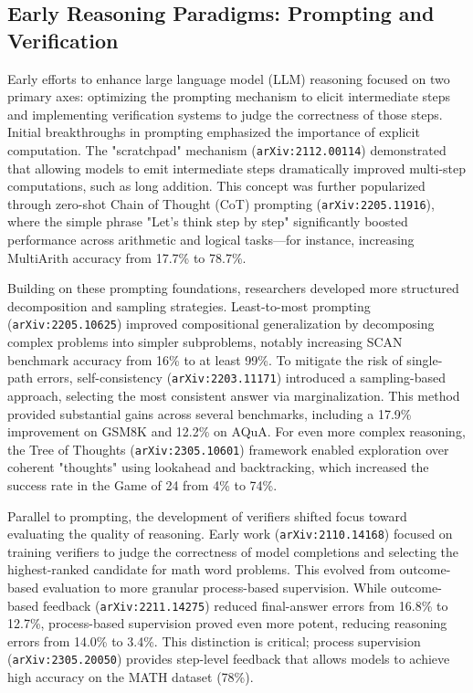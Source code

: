 \documentclass[11pt]{article}
\begin{document}
\subsection{Early Reasoning Paradigms: Prompting and Verification}

Early efforts to enhance large language model (LLM) reasoning focused on two primary axes: optimizing the prompting mechanism to elicit intermediate steps and implementing verification systems to judge the correctness of those steps. Initial breakthroughs in prompting emphasized the importance of explicit computation. The "scratchpad" mechanism (\texttt{arXiv:2112.00114}) demonstrated that allowing models to emit intermediate steps dramatically improved multi-step computations, such as long addition. This concept was further popularized through zero-shot Chain of Thought (CoT) prompting (\texttt{arXiv:2205.11916}), where the simple phrase "Let's think step by step" significantly boosted performance across arithmetic and logical tasks—for instance, increasing MultiArith accuracy from 17.7\% to 78.7\%.

Building on these prompting foundations, researchers developed more structured decomposition and sampling strategies. Least-to-most prompting (\texttt{arXiv:2205.10625}) improved compositional generalization by decomposing complex problems into simpler subproblems, notably increasing SCAN benchmark accuracy from 16\% to at least 99\%. To mitigate the risk of single-path errors, self-consistency (\texttt{arXiv:2203.11171}) introduced a sampling-based approach, selecting the most consistent answer via marginalization. This method provided substantial gains across several benchmarks, including a 17.9\% improvement on GSM8K and 12.2\% on AQuA. For even more complex reasoning, the Tree of Thoughts (\texttt{arXiv:2305.10601}) framework enabled exploration over coherent "thoughts" using lookahead and backtracking, which increased the success rate in the Game of 24 from 4\% to 74\%.

Parallel to prompting, the development of verifiers shifted focus toward evaluating the quality of reasoning. Early work (\texttt{arXiv:2110.14168}) focused on training verifiers to judge the correctness of model completions and selecting the highest-ranked candidate for math word problems. This evolved from outcome-based evaluation to more granular process-based supervision. While outcome-based feedback (\texttt{arXiv:2211.14275}) reduced final-answer errors from 16.8\% to 12.7\%, process-based supervision proved even more potent, reducing reasoning errors from 14.0\% to 3.4\%. This distinction is critical; process supervision (\texttt{arXiv:2305.20050}) provides step-level feedback that allows models to achieve high accuracy on the MATH dataset (78\%).
\end{document}
